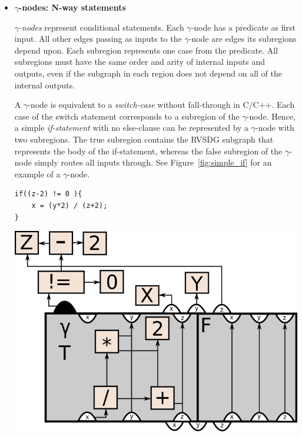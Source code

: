 \begin{itemize}

\item \textbf{$\gamma$-nodes: N-way statements}

\textit{$\gamma$-nodes} represent conditional statements. Each $\gamma$-node has
a predicate as first input. All other edges passing as inputs to the
$\gamma$-node are edges its subregions depend upon. Each subregion represents
one case from the predicate. All subregions must have the same order and arity
of internal inputs and outputs, even if the subgraph in each region does not
depend on all of the internal outputs.

A $\gamma$-node is equivalent to a \textit{switch-case} without fall-through in
C/C++. Each case of the switch statement corresponds to a subregion of the
$\gamma$-node. Hence, a simple \textit{if-statement} with no else-clause can be
represented by a $\gamma$-node with two subregions. The true subregion contains
the RVSDG subgraph that represents the body of the if-statement, whereas the
false subregion of the $\gamma$-node simply routes all inputs through. See
Figure~\ref{fig:simple_if} for an example of a $\gamma$-node.

\begin{centering}
	\noindent\begin{minipage}{0.36\textwidth}
		\begin{CenteredBox}
		\begin{lstlisting}[label={lst:simple_if}, style=minipage_customcpp,
basicstyle=\fontsize{10}{1}]
if((z-2) != 0 ){
	x = (y*2) / (z+2);
}
		\end{lstlisting}
		\end{CenteredBox}
	\end{minipage}
	\noindent\begin{minipage}{0.55\textwidth}
		\captionsetup{type=figure}
		\includegraphics[width=\textwidth]{figures/simple_if_example}
	\end{minipage}
	\label{fig:simple_if}
\end{centering}


\end{itemize}
